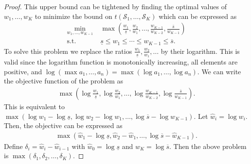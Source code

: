 \documentclass{article}
\newcommand{\mS}{\mathcal{S}}
\begin{document}
\begin{proof}
This upper bound can be tightened by finding the optimal values of \(w_1,\dots,w_K\) to minimize the bound on \(t(\mS_1,\dots,\mS_K)\) which can be expressed as 
\begin{equation}
	\label{prob:max_single}
	\begin{aligned}
	\min_{w_1,\dots,w_{K-1}} &\; \max\left(\frac{w_1}{\underline{s}}, \frac{w_2}{w_1}, \dots, \frac{w_{K-1}}{w_{K-2}}, \frac{\overline{s}}{w_{K-1}}\right)\\
	\text{s.t.} \;\quad &\; \underline{s} \leq w_1 \leq \cdots \leq w_{K-1} \leq \overline{s}.
	\end{aligned}
\end{equation}
To solve this problem we replace the ratios \(\frac{w_1}{\underline{s}}, \frac{w_2}{w_1}, \dots\) by their logarithm.
This is valid since the logarithm function is monotonically increasing, all elements are positive, and \(\log(\max{a_1,\dots,a_n}) = \max(\log a_1, \dots, \log a_n)\).
We can write the objective function of the problem as
\begin{equation*}
	\begin{aligned}
	\max\left(\log \frac{w_1}{\underline{s}}, \log \frac{w_2}{w_1}, \dots, \log \frac{w_{K-1}}{w_{K-2}}, \log \frac{\overline{s}}{w_{K-1}} \right).
	\end{aligned}
\end{equation*}
This is equivalent to $\max\left(\log w_1 - \log \underline{s}, \log w_2 - \log w_1, \dots, \log \overline{s} - \log w_{K-1}\right)$.
Let \(\hat{w}_i = \log w_i\). 
Then, the objective can be expressed as 
\begin{equation*}
	\begin{aligned}
	\max\left(\hat{w}_1 - \log{\underline{s}}, \hat{w}_2 - \hat{w}_1, \dots, \log{\overline{s}} - \hat{w}_{K-1}\right).
	\end{aligned}
\end{equation*}
Define \(\delta_i = \hat{w}_i - \hat{w}_{i-1}\) with \(\hat{w}_0 = \log \underline{s}\) and \(\hat{w}_{K} = \log \overline{s}\).
Then the above problem is $\max\left(\delta_1, \delta_2, \dots, \delta_K\right)$.

\end{proof}
\end{document}
